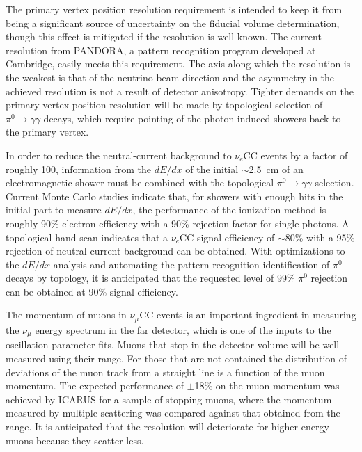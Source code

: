 The primary vertex position resolution requirement is intended 
to keep it from being a significant source of uncertainty on the
fiducial volume determination, though this effect is mitigated if the
resolution is well known.  The current resolution from PANDORA, 
a pattern recognition program developed at Cambridge, easily
meets this requirement.  The axis along which the resolution is the
weakest is that of the neutrino beam direction and the asymmetry in the
achieved resolution is not a result of detector anisotropy.   Tighter
demands on the primary vertex position resolution will be made by
topological selection of $\pi^0\rightarrow\gamma\gamma$ decays, which
require pointing of the photon-induced showers back to the primary
vertex.

In order to reduce the neutral-current background to $\nu_e$CC events
by a factor of roughly 100, information from the $dE/dx$ of the
initial $\sim$2.5~cm of an electromagnetic shower must be combined
with the topological $\pi^0\rightarrow\gamma\gamma$
selection\cite{docdb-6954}.  Current Monte Carlo studies indicate
that, for showers with enough hits in the initial part to measure
$dE/dx$, the performance of the ionization method is roughly 90\%
electron efficiency with a 90\% rejection factor for single photons.
A topological hand-scan indicates that a $\nu_e$CC signal
efficiency of $\sim$80\% with a 95\% rejection of neutral-current
background can be obtained.  With optimizations to the $dE/dx$
analysis and automating the pattern-recognition identification of
$\pi^0$ decays by topology, it is anticipated that the requested level
of 99\% $\pi^0$ rejection can be obtained at 90\% signal efficiency.

The momentum of muons in $\nu_\mu$CC events is an important ingredient
in measuring the $\nu_\mu$ energy spectrum in the far detector, which
is one of the inputs to the oscillation parameter fits.  Muons that
stop in the detector volume will be well measured using their range.
For those that are not contained the distribution of deviations of the
muon track from a straight line is a function of the muon momentum.
The expected performance of $\pm$18\% on the muon momentum was
achieved by ICARUS for a sample of stopping muons, where the momentum
measured by multiple scattering was compared against that obtained
from the range.  It is anticipated that the resolution will
deteriorate for higher-energy muons because they scatter less.


